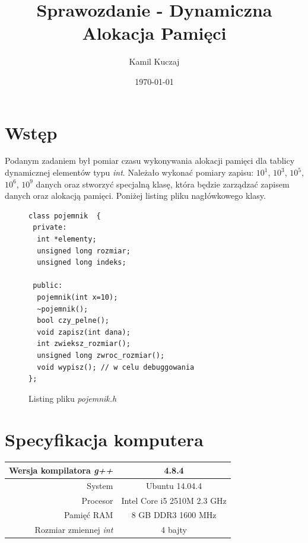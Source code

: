 \documentclass[11pt, a4paper]{article}
\author{Kamil Kuczaj}
\date{\today}
\title{Sprawozdanie - Dynamiczna Alokacja Pamięci}
\begin{document}
\maketitle

\section{Wstęp}
Podanym zadaniem był pomiar czasu wykonywania alokacji pamięci dla tablicy dynamicznej elementów typu \textit{int}. Należało wykonać pomiary zapisu: $10^1$, $10^3$, $10^5$, $10^6$, $10^9$ danych oraz stworzyć specjalną klasę, która będzie zarządzać zapisem danych oraz alokacją pamięci. Poniżej listing pliku nagłówkowego klasy.

\begin{figure}[h]
	\begin{center}
		\begin{lstlisting}
class pojemnik  {
 private:
  int *elementy;
  unsigned long rozmiar;
  unsigned long indeks;

 public:
  pojemnik(int x=10);
  ~pojemnik();
  bool czy_pelne();
  void zapisz(int dana);  
  int zwieksz_rozmiar();  
  unsigned long zwroc_rozmiar();
  void wypisz(); // w celu debuggowania
};
		\end{lstlisting}
		\caption{Listing pliku \textit{pojemnik.h}}
	\end{center}
\end{figure}

\section{Specyfikacja komputera}

\begin{center}
	\begin{tabular}{| r | c |}
	\hline
	Wersja kompilatora \textit{g++} & 4.8.4 \\ \hline
	System & Ubuntu 14.04.4 \\ \hline
	Procesor	 & Intel Core i5 2510M 2.3 GHz \\ \hline
	Pamięć RAM & 8 GB DDR3 1600 MHz \\ \hline
	Rozmiar zmiennej \textit{int} & 4 bajty \\ \hline
	\end{tabular}
\end{center}
\end{document}
